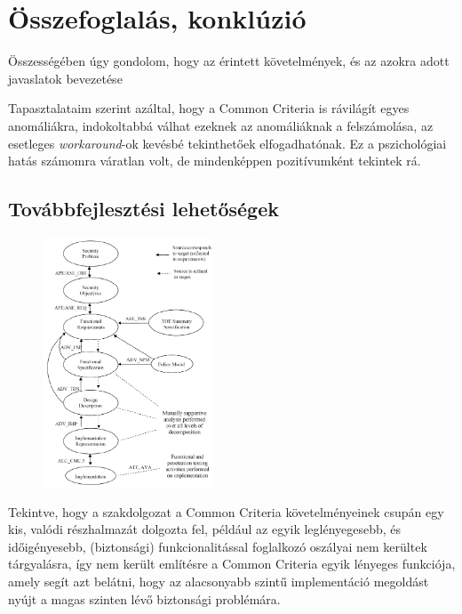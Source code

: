 \chapter{Összefoglalás, konklúzió}

Összességében úgy gondolom, hogy az érintett követelmények, és az azokra adott javaslatok bevezetése


Tapasztalataim szerint azáltal, hogy a Common Criteria is rávilágít egyes anomáliákra, indokoltabbá
válhat ezeknek az anomáliáknak a felszámolása, az esetleges \emph{workaround}-ok kevésbé
tekinthetőek elfogadhatónak. Ez a pszichológiai hatás számomra váratlan volt, de mindenképpen
pozitívumként tekintek rá.

\section{Továbbfejlesztési lehetőségek}
\begin{figure}
    \includegraphics[width=0.45\textwidth, keepaspectratio]{figures/layers.png}
\end{figure}
Tekintve, hogy a szakdolgozat a Common Criteria követelményeinek csupán egy kis, valódi részhalmazát
dolgozta fel, például az egyik leglényegesebb, és időigényesebb, (biztonsági) funkcionalitással
foglalkozó oszályai nem kerültek tárgyalásra, így nem került említésre a Common Criteria egyik
lényeges funkciója, amely segít azt belátni, hogy az alacsonyabb szintű implementáció megoldást
nyújt a magas szinten lévő biztonsági problémára.

